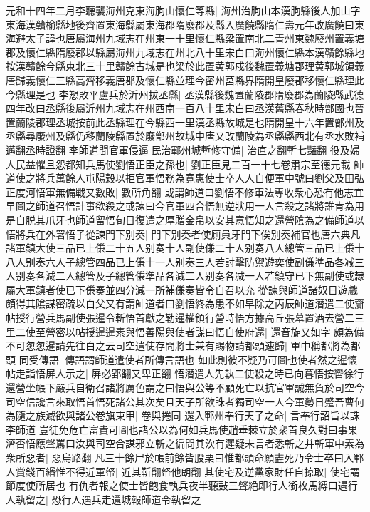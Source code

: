 元和十四年二月李聽襲海州克東海朐山懷仁等縣|{
	海州治朐山本漢胊縣後人加山字東海漢贛榆縣地後齊置東海縣屬東海郡隋廢郡及縣入廣饒縣隋仁壽元年改廣饒曰東海避太子諱也唐屬海州九域志在州東一十里懷仁縣梁置南北二青州東魏廢州置義塘郡及懷仁縣隋廢郡以縣屬海州九域志在州北八十里宋白曰海州懷仁縣本漢贛餘縣地按漢贛餘今縣東北三十里贛餘古城是也梁於此置黄郭戍後魏置義塘郡理黄郭城領義唐歸義懷仁三縣高齊移義唐郡及懷仁縣並理今密州莒縣界隋開皇廢郡移懷仁縣理此今縣理是也}
李愬敗平盧兵於沂州拔丞縣|{
	丞漢縣後魏置蘭陵郡隋廢郡為蘭陵縣武德四年改曰丞縣後屬沂州九域志在州西南一百八十里宋白曰丞漢舊縣春秋時鄫國也晉置蘭陵郡理丞城按前此丞縣理在今縣西一里漢丞縣故城是也隋開皇十六年置鄫州及丞縣尋廢州及縣仍移蘭陵縣置於廢鄫州故城中唐又改蘭陵為丞縣縣西北有丞水敗補邁翻丞時證翻}
李師道聞官軍侵逼民治鄆州城塹修守備|{
	治直之翻塹七豔翻}
役及婦人民益懼且怨都知兵馬使劉悟正臣之孫也|{
	劉正臣見二百一十七卷肅宗至德元載}
師道使之將兵萬餘人屯陽穀以拒官軍悟務為寛惠使士卒人人自便軍中號曰劉父及田弘正度河悟軍無備戰又數敗|{
	數所角翻}
或謂師道曰劉悟不修軍法專收衆心恐有他志宜早圖之師道召悟計事欲殺之或諫曰今官軍四合悟無逆狀用一人言殺之諸將誰肯為用是自脱其爪牙也師道留悟旬日復遣之厚贈金帛以安其意悟知之還營隂為之備師道以悟將兵在外署悟子從諫門下别奏|{
	門下别奏者使厠員牙門下俟别奏補官也唐六典凡諸軍鎮大使三品已上傔二十五人别奏十人副使傔二十人别奏八人總管三品已上傔十八人别奏六人子總管四品已上傔十一人别奏三人若討擊防禦遊奕使副傔準品各减三人别奏各減二人總管及子總管傔準品各減二人别奏各减一人若鎮守已下無副使或隸屬大軍鎮者使已下傔奏並四分減一所補傔奏皆令自召以充}
從諫與師道諸奴日遊戲頗得其隂謀密疏以白父又有謂師道者曰劉悟終為患不如早除之丙辰師道潜遣二使齎帖授行營兵馬副使張暹令斬悟首獻之勒暹權領行營時悟方據高丘張幕置酒去營二三里二使至營密以帖授暹暹素與悟善陽與使者謀曰悟自使府還|{
	還音旋又如字}
頗為備不可怱怱暹請先往白之云司空遣使存問將士兼有賜物請都頭速歸|{
	軍中稱都將為都頭}
同受傳語|{
	傳語謂師道遣使者所傳言語也}
如此則彼不疑乃可圖也使者然之暹懷帖走詣悟屏人示之|{
	屏必郢翻又卑正翻}
悟潜遣人先執二使殺之時已向暮悟按轡徐行還營坐帳下嚴兵自衛召諸將厲色謂之曰悟與公等不顧死亡以抗官軍誠無負於司空今司空信讒言來取悟首悟死諸公其次矣且天子所欲誅者獨司空一人今軍勢日蹙吾曹何為隨之族滅欲與諸公卷旗束甲|{
	卷與捲同}
還入鄆州奉行天子之命|{
	言奉行詔旨以誅李師道}
豈徒免危亡富貴可圖也諸公以為何如兵馬使趙垂棘立於衆首良久對曰事果濟否悟應聲罵曰汝與司空合謀邪立斬之徧問其㳄有遲疑未言者悉斬之并斬軍中素為衆所惡者|{
	惡烏路翻}
凡三十餘尸於帳前餘皆股栗曰惟都頭命願盡死乃令士卒曰入鄆人賞錢百緡惟不得近軍帑|{
	近其靳翻帑他朗翻}
其使宅及逆黨家財任自掠取|{
	使宅謂節度使所居也}
有仇者報之使士皆飽食執兵夜半聽鼔三聲絶即行人銜枚馬縛口遇行人執留之|{
	恐行人遇兵走還城報師道令執留之}
